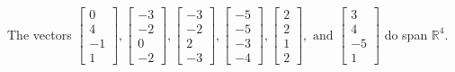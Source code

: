 \begin{exercise}
\begin{exerciseStatement}
  \end{exerciseStatement}
  \begin{exerciseAnswer}
   The vectors \(\left[\begin{array}{r}
0 \\
4 \\
-1 \\
1
\end{array}\right] , \left[\begin{array}{r}
-3 \\
-2 \\
0 \\
-2
\end{array}\right] , \left[\begin{array}{r}
-3 \\
-2 \\
2 \\
-3
\end{array}\right] , \left[\begin{array}{r}
-5 \\
-5 \\
-3 \\
-4
\end{array}\right] , \left[\begin{array}{r}
2 \\
2 \\
1 \\
2
\end{array}\right] , \text{ and } \left[\begin{array}{r}
3 \\
4 \\
-5 \\
1
\end{array}\right]\) 
  	 do  
	span \(\mathbb{R}^4\).
  


  \end{exerciseAnswer}
\end{exercise}